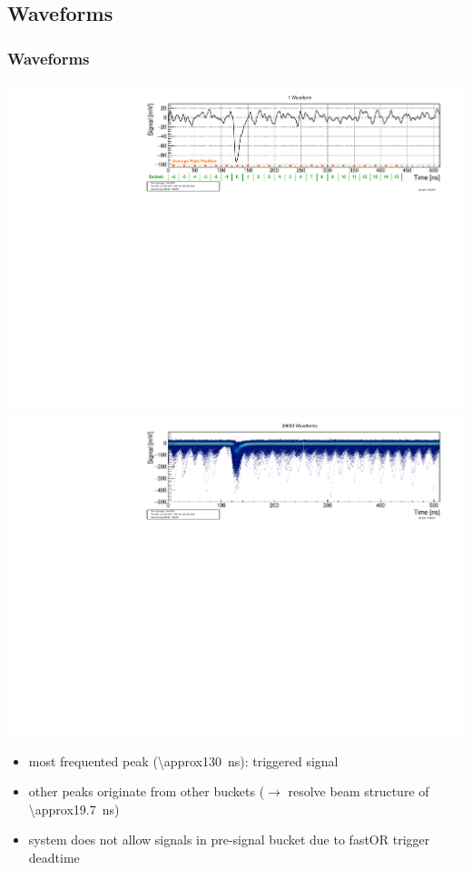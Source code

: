 \documentclass[9pt]{beamer}
\begin{document}
\subsection{Waveforms}
\begin{frame}
	\frametitle{Waveforms}
	\vspace*{-20pt}
	\begin{center}
		\includegraphics[angle=270, width=.7\textwidth]{SignalWaveform}\\
		\includegraphics[angle=270, width=.7\textwidth]{SignalWaveforms20000}\\
	\end{center}
	\begin{itemize}
		\item most frequented peak (\SI{\approx130}{ns}): triggered signal
		\item other peaks originate from other buckets ($\rightarrow$ resolve beam structure of \SI{\approx19.7}{ns})
		\item system does not allow signals in pre-signal bucket due to fastOR trigger deadtime
	\end{itemize}
\end{frame}
\end{document}
